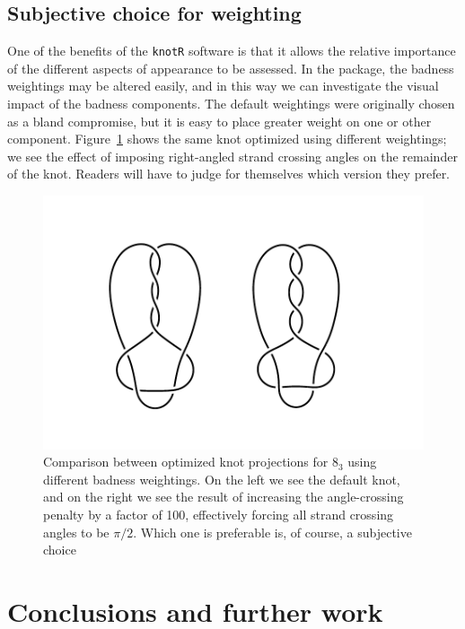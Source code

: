 \documentclass{birkjour}
\theoremstyle{definition}
\theoremstyle{remark}
\numberwithin{equation}{section}
\begin{document}
\subsection{Subjective \label{section_cca} choice for weighting}


One of the benefits of the {\tt knotR} software is that it allows the
relative importance of the different aspects of appearance to be
assessed.  In the package, the badness weightings may be altered
easily, and in this way we can investigate the visual impact of the
badness components.  The default weightings were originally chosen as
a bland compromise, but it is easy to place greater weight on one or
other component.  Figure~\ref{figure_cca} shows the same knot optimized
using different weightings; we see the effect of imposing right-angled
strand crossing angles on the remainder of the knot.  Readers will
have to judge for themselves which version they prefer.

\begin{figure}[htbp]
  \begin{center}
\includegraphics[width=13cm]{compare_crossing_angles}  %
\caption{Comparison between optimized knot projections for $8_3$
  \label{figure_cca} using different  badness weightings.  On the
  left we see the default knot, and on the right we see the result of
  increasing the angle-crossing penalty by a factor of 100,
  effectively forcing all strand crossing angles to be $\pi/2$.  Which
  one is preferable is, of course, a subjective choice}
  \end{center}
\end{figure}


\section{Conclusions and further work}
\end{document}
